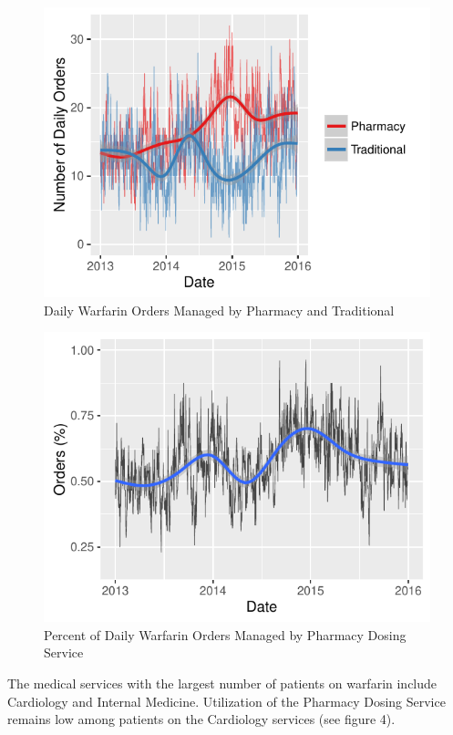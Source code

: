 \documentclass[]{article}
\begin{document}
\begin{figure}[H]
\centering
\includegraphics{warfarin_analysis_2015_files/figure-latex/dose_service_use-1.pdf}
\caption{Daily Warfarin Orders Managed by Pharmacy and Traditional}
\end{figure}

\begin{figure}[H]
\centering
\includegraphics{warfarin_analysis_2015_files/figure-latex/dose_service_use2-1.pdf}
\caption{Percent of Daily Warfarin Orders Managed by Pharmacy Dosing
Service}
\end{figure}

The medical services with the largest number of patients on warfarin
include Cardiology and Internal Medicine. Utilization of the Pharmacy
Dosing Service remains low among patients on the Cardiology services
(see figure 4).
\end{document}

